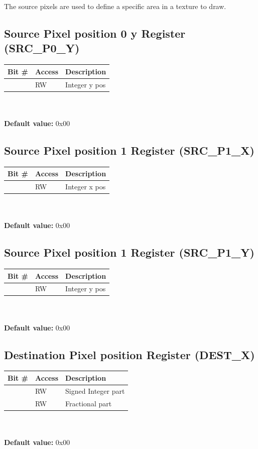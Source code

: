 \documentclass[10pt,a4paper]{article}
\begin{document}
The source pixels are used to define a specific area in a texture to draw.

\subsection{Source Pixel position 0 y Register (SRC\_P0\_Y)}
\begin{tabular}{|l|l|l|}
\hline \textbf{Bit \#} & \textbf{Access} & \textbf{Description} \\ 
\hline
\hline [31:0] & RW & Integer y pos \\
\hline 
\end{tabular}
\\\\
\textbf{Default value:} 0x00


\subsection{Source Pixel position 1 Register (SRC\_P1\_X)}
\begin{tabular}{|l|l|l|}
\hline \textbf{Bit \#} & \textbf{Access} & \textbf{Description} \\ 
\hline
\hline [31:0] & RW & Integer x pos \\
\hline 
\end{tabular}
\\\\
\textbf{Default value:} 0x00

\subsection{Source Pixel position 1 Register (SRC\_P1\_Y)}
\begin{tabular}{|l|l|l|}
\hline \textbf{Bit \#} & \textbf{Access} & \textbf{Description} \\ 
\hline
\hline [31:0] & RW & Integer y pos \\
\hline 
\end{tabular}
\\\\
\textbf{Default value:} 0x00

\subsection{Destination Pixel position Register (DEST\_X)}
\begin{tabular}{|l|l|l|}
\hline \textbf{Bit \#} & \textbf{Access} & \textbf{Description} \\ 
\hline
\hline [31:16] & RW & Signed Integer part \\
\hline [15:0]  & RW & Fractional part \\
\hline 
\end{tabular}
\\\\
\textbf{Default value:} 0x00
\end{document}
